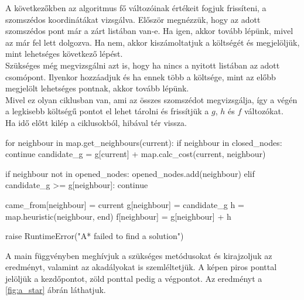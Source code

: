 \bigskip

A következőkben az algoritmus fő változóinak értékeit fogjuk frissíteni, a szomszédos koordinátákat vizsgálva. Először megnézzük, hogy az adott szomszédos pont már a zárt listában van-e. Ha igen, akkor tovább lépünk, mivel az már fel lett dolgozva. Ha nem, akkor kiszámoltatjuk a költségét és megjelöljük, mint lehetséges következő lépést.\\

Szükséges még megvizsgálni azt is, hogy ha nincs a nyitott listában az adott csomópont. Ilyenkor hozzáadjuk és ha ennek több a költsége, mint az előbb megjelölt lehetséges pontnak, akkor tovább lépünk.\\

Mivel ez olyan ciklusban van, ami az összes szomszédot megvizsgálja, így a végén a legkisebb költségű pontot el lehet tárolni és frissítjük a $ g $, $ h $ és $ f $ változókat.\\

Ha idő előtt kilép a ciklusokból, hibával tér vissza.

\begin{python}
	for neighbour in map.get_neighbours(current):
            if neighbour in closed_nodes:
                continue
            candidate_g = g[current] + map.calc_cost(current, neighbour)

            if neighbour not in opened_nodes:
                opened_nodes.add(neighbour)
            elif candidate_g >= g[neighbour]:
                continue

            came_from[neighbour] = current
            g[neighbour] = candidate_g
            h = map.heuristic(neighbour, end)
            f[neighbour] = g[neighbour] + h

    raise RuntimeError("A* failed to find a solution")
\end{python}

\bigskip

A main függvényben meghívjuk a szükséges metódusokat és kirajzoljuk az eredményt, valamint az akadályokat is szemléltetjük. A képen piros ponttal jelöljük a kezdőpontot, zöld ponttal pedig a végpontot. Az eredményt a \ref{fig:a_star} ábrán láthatjuk.

